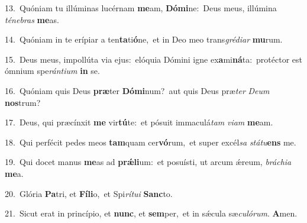 {\numbfont\textcolor{\numbcolor}{13.}}~Quóniam tu illúminas lucérnam \textbf{me}\-am, \textbf{Dó}\-\textbf{mi}ne:~\star Deus meus, illúmina \textit{té}\-\textit{ne}\textit{bras} \textbf{me}\-as.\par
{\numbfont\textcolor{\numbcolor}{14.}}~Quóniam in te erípiar a ten\-\textbf{ta}\-ti\-\textbf{ó}\-ne,~\star et in Deo meo trans\-\textit{gré}\-\textit{di}\textit{ar} \textbf{mu}\-rum.\par
{\numbfont\textcolor{\numbcolor}{15.}}~Deus meus, impollúta via ejus:~\dagger elóquia Dómini igne ex\-\textbf{a}\-mi\-\textbf{ná}\-ta:~\star protéctor est ómnium spe\-\textit{rán}\-\textit{ti}\textit{um} \textbf{in} se.\par
{\numbfont\textcolor{\numbcolor}{16.}}~Quóniam quis Deus \textbf{præ}\-ter \textbf{Dó}\-\textbf{mi}num?~\star aut quis Deus præ\textit{ter} \textit{De}\-\textit{um} \textbf{nos}\-trum?\par
{\numbfont\textcolor{\numbcolor}{17.}}~Deus, qui præcínxit \textbf{me} vir\-\textbf{tú}\-te:~\star et pósuit immaculá\textit{tam} \textit{vi}\-\textit{am} \textbf{me}\-am.\par
{\numbfont\textcolor{\numbcolor}{18.}}~Qui perfécit pedes meos \textbf{tam}\-quam cer\-\textbf{vó}\-rum,~\star et super excél\textit{sa} \textit{stá}\-\textit{tu}\textbf{ens} me.\par
{\numbfont\textcolor{\numbcolor}{19.}}~Qui docet manus \textbf{me}\-as ad \textbf{prǽ}\-\textbf{li}um:~\star et posuísti, ut arcum ǽreum, \textit{brá}\-\textit{chi}\textit{a} \textbf{me}\-a.\par
{\numbfont\textcolor{\numbcolor}{20.}}~Glória \textbf{Pa}\-tri, et \textbf{Fí}\-\textbf{li}o,~\star et Spi\-\textit{rí}\-\textit{tu}\textit{i} \textbf{Sanc}\-to.\par
{\numbfont\textcolor{\numbcolor}{21.}}~Sicut erat in princípio, et \textbf{nunc}\-, et \textbf{sem}\-per,~\star et in sǽcula sæ\-\textit{cu}\-\textit{ló}\textit{rum}. \textbf{A}\-men.\par

